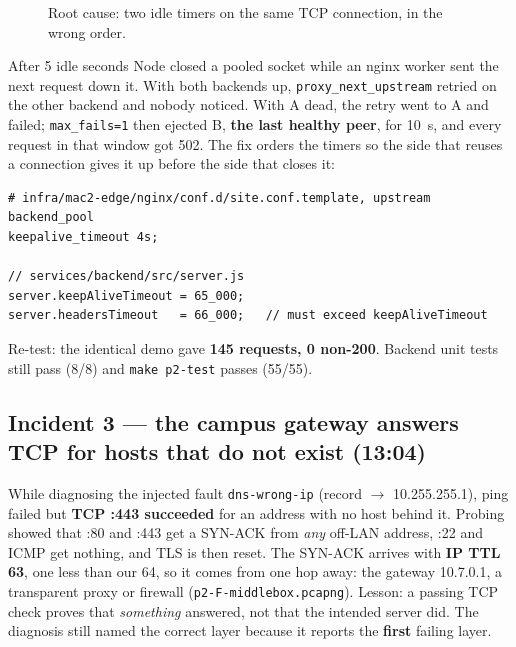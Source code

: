 \documentclass[11pt,a4paper]{article}
\begin{document}
\begin{figure}[!htbp]
\centering
\resizebox{\textwidth}{!}{\drawKeepalive}
\caption{Root cause: two idle timers on the same TCP connection, in the wrong order.}
\end{figure}

After 5 idle seconds Node closed a pooled socket while an nginx worker sent the next request down
it. With both backends up, \texttt{proxy\_next\_upstream} retried on the other backend and nobody
noticed. With A dead, the retry went to A and failed; \texttt{max\_fails=1} then ejected B,
\textbf{the last healthy peer}, for 10~s, and every request in that window got 502. The fix orders
the timers so the side that reuses a connection gives it up before the side that closes it:

\par\noindent\begin{minipage}{\linewidth}
\begin{lstlisting}
# infra/mac2-edge/nginx/conf.d/site.conf.template, upstream backend_pool
keepalive_timeout 4s;

// services/backend/src/server.js
server.keepAliveTimeout = 65_000;
server.headersTimeout   = 66_000;   // must exceed keepAliveTimeout
\end{lstlisting}
\end{minipage}\par
Re-test: the identical demo gave \textbf{145 requests, 0 non-200}. Backend unit tests still pass
(8/8) and \texttt{make p2-test} passes (55/55).

\subsection{Incident 3 --- the campus gateway answers TCP for hosts that do not exist (13:04)}
While diagnosing the injected fault \texttt{dns-wrong-ip} (record $\to$ 10.255.255.1), ping failed but
\textbf{TCP :443 succeeded} for an address with no host behind it. Probing showed that :80 and :443
get a SYN-ACK from \emph{any} off-LAN address, :22 and ICMP get nothing, and TLS is then reset. The
SYN-ACK arrives with \textbf{IP TTL 63}, one less than our 64, so it comes from one hop away: the
gateway 10.7.0.1, a transparent proxy or firewall (\texttt{p2-F-middlebox.pcapng}). Lesson: a
passing TCP check proves that \emph{something} answered, not that the intended server did. The
diagnosis still named the correct layer because it reports the \textbf{first} failing layer.
\end{document}

